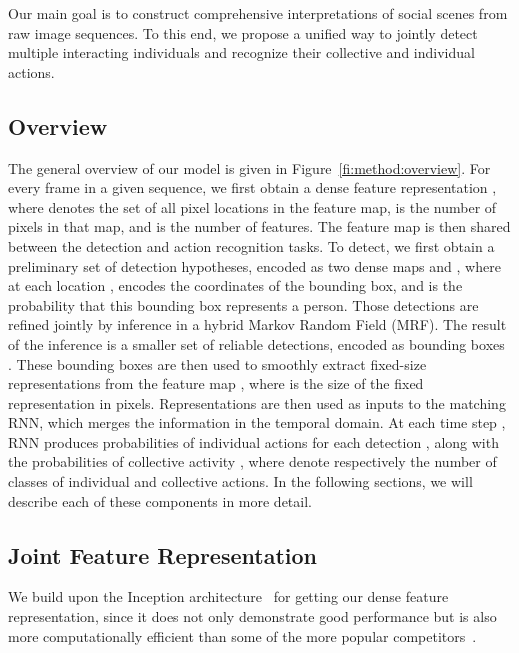 \documentclass[10pt,twocolumn,letterpaper]{article}
\begin{document}
Our main goal is to construct comprehensive interpretations of social scenes
from raw image sequences. To this end, we propose a unified way to jointly detect multiple
interacting individuals and recognize their collective and individual actions.

\subsection{Overview}
\vspace{-0.15cm}

The general overview of our model is given in Figure~\ref{fi:method:overview}.
For every frame  in a given sequence, we first
obtain
a dense feature representation , where  denotes the set of all pixel locations in the feature
map,  is the number of pixels in that map, and  is the
number of features. The feature map  is then shared between the
detection and action recognition tasks.
To detect, we first obtain a preliminary set of detection hypotheses,
encoded as two dense maps  and ,
where at each location ,  encodes the coordinates of the bounding box,
and  is the probability that this bounding box represents a person.
Those detections are refined jointly by inference in a hybrid Markov
Random Field (MRF). The result of the inference is a smaller set of 
reliable detections, encoded as bounding boxes . 
These bounding boxes are then used to smoothly extract
fixed-size representations  from the feature map
, where  is the size of the fixed representation in pixels. 
Representations  are then used as inputs to the matching RNN, which 
merges the information in the temporal domain. At each time step , RNN produces
probabilities  of individual actions for each detection 
, along with the probabilities of collective activity 
, where
 denote respectively the number of classes of individual and
collective actions. In the following sections, we will describe each of these
components in more detail. 



\subsection{Joint Feature Representation}
We build upon the Inception architecture~\cite{Szegedy2015} for getting our
dense feature representation, since it does not only demonstrate good performance
but is also more computationally efficient than some of the more popular
competitors~\cite{Simonyan2014, Krizhevsky2012}. 
\end{document}
